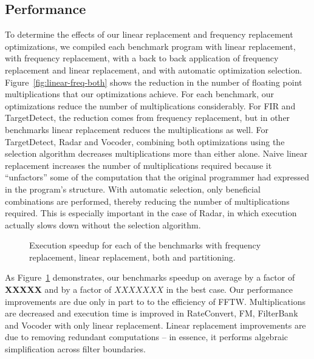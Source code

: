 \subsection{Performance}
To determine the effects of our linear replacement and frequency
replacement optimizations, we compiled each benchmark program with
linear replacement, with frequency replacement, with a back to back
application of frequency replacement and linear replacement, and with
automatic optimization selection.  Figure~\ref{fig:linear-freq-both}
shows the reduction in the number of floating point multiplications
that our optimizations achieve.  For each benchmark, our optimizations
reduce the number of multiplications considerably. For FIR and
TargetDetect, the reduction comes from frequency replacement, but in
other benchmarks linear replacement reduces the multiplications as
well. For TargetDetect, Radar and Vocoder, combining both
optimizations using the selection algorithm decreases multiplications
more than either alone. Naive linear replacement increases the number
of multiplications required because it ``unfactors'' some of the
computation that the original programmer had expressed in the
program's structure. With automatic selection, only beneficial
combinations are performed, thereby reducing the number of
multiplications required.  This is especially important in the case of
Radar, in which execution actually slows down without the selection
algorithm.

\begin{figure}[t]
\center
\epsfxsize=3.2in
\vspace{-6pt}
\caption{Execution speedup for each of the benchmarks with 
  frequency replacement, linear replacement, both and partitioning.}
\label{fig:execution-speedup}
\vspace{-6pt}
\end{figure}


As Figure~\ref{fig:execution-speedup} demonstrates, our benchmarks
speedup on average by a factor of {\bf XXXXX} and by a factor of
$XXXXXXX$ in the best case.  Our performance improvements are due only
in part to to the efficiency of FFTW.  Multiplications are decreased
and execution time is improved in RateConvert, FM, FilterBank and
Vocoder with only linear replacement. Linear replacement improvements
are due to removing redundant computations -- in essence, it performs
algebraic simplification across filter boundaries.


